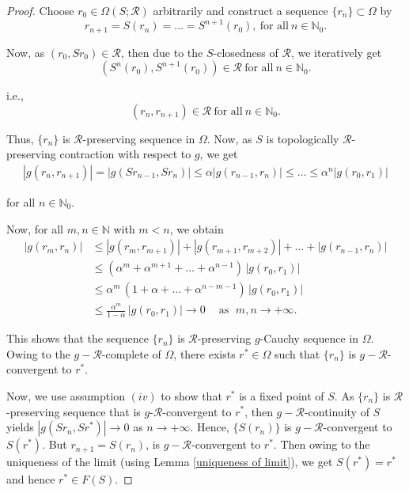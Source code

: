 \documentclass[10pt, reqno]{amsart}
\theoremstyle{definition}
\theoremstyle{remark}
\numberwithin{equation}{section}
\begin{document}
\begin{proof}
	Choose $ r_0 \in \Omega ( S; \mathcal{R})$ arbitrarily and construct a sequence $ \{ r_n \} \subset \Omega $ by $$ r_{n+1}=S ( r_n)=\ldots= S ^{n+1}(r_0),\ \text{for all}\ n\in\mathbb{N}_0.$$ 
	
	Now, as $( r_0, S r_0)\in\mathcal{R}$, then due to the $S $-closedness of $\mathcal{R}$, we iteratively get 
	\begin{equation*}
		( S ^{n}(r_0), S^{n+1}(r_0))\in\mathcal{R}\ \text{for all}\ n\in\mathbb{N}_0.
	\end{equation*}
    
	i.e.,	
	\begin{equation}
	(r_n, r_{n+1})\in\mathcal{R}\ \text{for all}\ n\in\mathbb{N}_0.
	\end{equation}
    
	Thus, $ \{ r_n \}$ is $\mathcal{R}$-preserving sequence in $ \Omega $. Now, as $ S $ is topologically $\mathcal{R}$-preserving contraction with respect to $g$, we get	
	\begin{align*}
	  |g(r_n,r_{n+1})| =   |g( S r_{n-1}, S r_{n})| 
	   \leq    \alpha |g(r_{n-1},r_{n})| \leq
	   \ldots    
	   \leq  \alpha^n |g(r_{0},r_{1})|
	\end{align*}
    
	for all $n\in\mathbb{N}_0$. 
    
	Now, for all $m,n\in\mathbb{N}$ with $m<n$, we obtain
		\begin{align*}
		|g(r_m,r_n)| & \leq  |g(r_m,r_{m+1})|+|g(r_{m+1},r_{m+2})|+\ldots+|g(r_{n-1},r_{n})| \\
		& \leq   (\alpha^m+\alpha^{m+1}+\ldots+\alpha^{n-1}) \, |g(r_{0},r_{1})|\\
		& \leq  \alpha^m \, (1+\alpha+\ldots+\alpha^{n-m-1}) \, |g(r_{0},r_{1})|\\
		& \leq   \frac{\alpha^m}{1-\alpha} \,  |g(r_{0},r_{1})|\to 0 ~\quad  \text{as}~ ~ \, m,n\to +\infty.    
	\end{align*}
    
	This shows that the sequence $ \{ r_n \}$ is  $\mathcal{R}$-preserving $g$-Cauchy sequence in $ \Omega $. 
	Owing to the $g-\mathcal{R}$-complete of $ \Omega $, there exists $r^*\in  \Omega $ such that $ \{ r_n \} $ is $g-\mathcal{R}$-convergent to $r^*$.
    
	Now, we use assumption $(iv)$ to show that $r^*$ is a fixed point of $ S $. As $ \{ r_n \} $ is  $\mathcal{R}$-preserving sequence that is  $g$-$\mathcal{R}$-convergent to $r^*$, then $g-\mathcal{R}$-continuity of $ S$ yields $|g(Sr_n, Sr^*)|\to 0$ as $n\to+\infty.$ 
	Hence, $\{S(r_n)\}$ is  $g-\mathcal{R}$-convergent to $S(r^*)$. But $r_{n+1}= S (r_n)$, is  $g-\mathcal{R}$-convergent to $r^*$. 
	Then owing to the uniqueness of the limit (using Lemma \ref{uniqueness of limit}), we get $S(r^*)=r^*$ and  hence $ r ^* \in F (S ) $.   
	

\end{proof}
\end{document}

